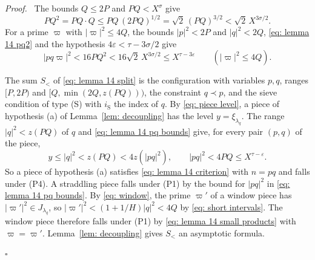 \documentclass{article}
\numberwithin{equation}{section}
\newenvironment{proof}[1][Proof]{\par\medskip\noindent\textit{#1.}\ }{\hfill$\square$\par\medskip}
\newcommand{\Le}{\leqslant}
\begin{document}
\begin{proof}
The bounds $Q \Le 2P$ and $PQ < X^{\sigma}$ give
\begin{equation}
\label{eq: lemma 14 pq2}
PQ^2 = PQ \cdot Q \Le PQ\, (2PQ)^{1/2} = \sqrt{2}\, (PQ)^{3/2} < \sqrt{2}\, X^{3\sigma/2}.
\end{equation}
For a prime $\varpi$ with $|\varpi|^2 \Le 4Q$, the bounds $|p|^2 < 2P$ and $|q|^2 < 2Q$, \eqref{eq: lemma 14 pq2} and the hypothesis $4\varepsilon < \tau - 3\sigma/2$ give
\begin{equation}
\label{eq: lemma 14 small products}
|pq\varpi|^2 < 16 PQ^2 < 16\sqrt{2}\, X^{3\sigma/2} \Le X^{\tau - 3\varepsilon} \qquad (|\varpi|^2 \Le 4Q).
\end{equation}

The sum $S_<$ of \eqref{eq: lemma 14 split} is the configuration with variables $p, q$, ranges $[P, 2P)$ and $[Q, \min(2Q, z(PQ)))$, the constraint $q \prec p$, and the sieve condition of type (S) with $i_{\mathrm{S}}$ the index of $q$. By \eqref{eq: piece level}, a piece of hypothesis (a) of Lemma~\ref{lem: decoupling} has the level $y = \xi_{\lambda_q}$. The range $|q|^2 < z(PQ)$ of $q$ and \eqref{eq: lemma 14 pq bounds} give, for every pair $(p, q)$ of the piece,
\begin{equation*}
y \Le |q|^2 < z(PQ) < 4z(|pq|^2), \qquad |pq|^2 < 4PQ \Le X^{\tau - \varepsilon}.
\end{equation*}
So a piece of hypothesis (a) satisfies \eqref{eq: lemma 14 criterion} with $n = pq$ and falls under (P4). A straddling piece falls under (P1) by the bound for $|pq|^2$ in \eqref{eq: lemma 14 pq bounds}. By \eqref{eq: window}, the prime $\varpi'$ of a window piece has $|\varpi'|^2 \in J_{\lambda_q}$, so $|\varpi'|^2 < (1 + 1/H)|q|^2 < 4Q$ by \eqref{eq: short intervals}. The window piece therefore falls under (P1) by \eqref{eq: lemma 14 small products} with $\varpi = \varpi'$. Lemma~\ref{lem: decoupling} gives $S_<$ an asymptotic formula.


\end{proof}
\end{document}
